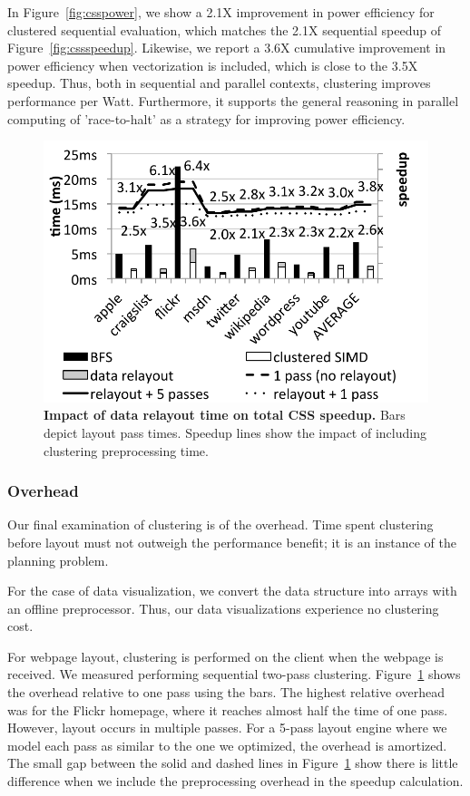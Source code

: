 In Figure~\ref{fig:csspower}, we show a 2.1X improvement in power efficiency for clustered sequential evaluation, which matches the 2.1X sequential speedup of Figure~\ref{fig:cssspeedup}. Likewise, we report a 3.6X cumulative improvement in power efficiency when vectorization is included, which is close to the 3.5X speedup. Thus, both in sequential and parallel contexts, clustering improves performance per Watt. Furthermore, it supports the general reasoning in parallel computing of 'race-to-halt' as a strategy for improving power efficiency.


\begin{figure}
\centering
\includegraphics[trim=0 0 0 0,clip,width=0.6\columnwidth]{chapter6/datarelayouttime3}
\caption{\textbf{Impact of data relayout time on total CSS speedup.} Bars depict layout pass times. Speedup lines show the impact of including clustering preprocessing time.}
\label{fig:cssrelayout}
\end{figure}



\subsubsection{Overhead}
Our final examination of clustering is of the overhead. Time spent clustering before layout must not outweigh the performance benefit; it is an instance of the planning problem. 

For the case of data visualization, we convert the data structure into arrays with an offline preprocessor. Thus, our data visualizations experience no clustering cost.

For webpage layout, clustering is performed on the client when the webpage is received. We measured performing sequential two-pass clustering. Figure~\ref{fig:cssrelayout} shows the overhead relative to one pass using the bars. The highest relative overhead was for the Flickr homepage, where it reaches almost half the time of one pass. However, layout occurs in multiple passes. For a 5-pass layout engine where we model each pass as similar to the one we optimized, the overhead is amortized. The small gap between the solid and dashed lines in Figure~\ref{fig:cssrelayout} show there is little difference when we include the preprocessing overhead in the speedup calculation.



